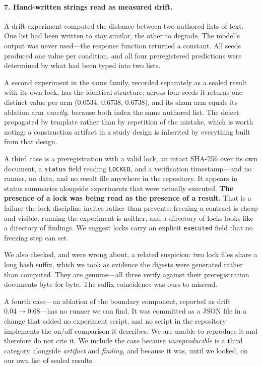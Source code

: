 \documentclass[11pt]{article}
\begin{document}
\paragraph{7. Hand-written strings read as measured drift.}
A drift experiment computed the distance between two authored lists of text.
One list had been written to stay similar, the other to degrade. The model's
output was never used---the response function returned a constant. All seeds
produced one value per condition, and all four preregistered predictions were
determined by what had been typed into two lists.

A second experiment in the same family, recorded separately as a sealed result
with its own lock, has the identical structure: across four seeds it returns
one distinct value per arm ($0.0534$, $0.6738$, $0.6738$), and its sham arm
equals its ablation arm \emph{exactly}, because both index the same authored
list. The defect propagated by template rather than by repetition of the
mistake, which is worth noting: a construction artifact in a study design is
inherited by everything built from that design.

A third case is a preregistration with a valid lock, an intact SHA-256 over its
own document, a \texttt{status} field reading \texttt{LOCKED}, and a verification
timestamp---and no runner, no data, and no result file anywhere in the
repository. It appears in status summaries alongside experiments that were
actually executed. \textbf{The presence of a lock was being read as the presence
of a result.} That is a failure the lock discipline invites rather than
prevents: freezing a contract is cheap and visible, running the experiment is
neither, and a directory of locks looks like a directory of findings. We suggest
locks carry an explicit \texttt{executed} field that no freezing step can set.

We also checked, and were wrong about, a related suspicion: two lock files share
a long hash suffix, which we took as evidence the digests were generated rather
than computed. They are genuine---all three verify against their preregistration
documents byte-for-byte. The suffix coincidence was ours to misread.

A fourth case---an ablation of the boundary component, reported as drift
$0.04 \to 0.68$---has no runner we can find. It was committed
as a JSON file in a change that added no experiment script, and no script in
the repository implements the on/off comparison it describes. We are unable to
reproduce it and therefore do not cite it. We include the case because
\emph{unreproducible} is a third category alongside \emph{artifact} and
\emph{finding}, and because it was, until we looked, on our own list of sealed
results.
\end{document}
